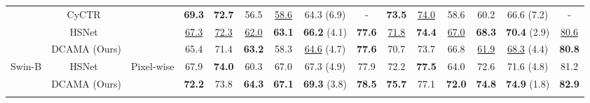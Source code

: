 \documentclass[runningheads,table,xcdraw]{llncs}
\begin{document}
\begin{table*}[t]
{\begin{tabular}{ccccccccccccccc}
\multicolumn{1}{c|}{}                            & \multicolumn{1}{c|}{CyCTR~\cite{zhang2021few}}               & \multicolumn{1}{c|}{}                            & \textbf{69.3} & \textbf{72.7} & 56.5          & \multicolumn{1}{c|}{\uline{58.6}}  & \multicolumn{1}{c|}{64.3 (6.9)}          & \multicolumn{1}{c|}{-}             & \textbf{73.5} & \uline{74.0}  & 58.6          & \multicolumn{1}{c|}{60.2}          & \multicolumn{1}{c|}{66.6 (7.2)}          & -             \\
\multicolumn{1}{c|}{}                            & \multicolumn{1}{c|}{HSNet~\cite{min2021hypercorrelation}}           & \multicolumn{1}{c|}{}                            & \uline{67.3}  & \uline{72.3}  & \uline{62.0}  & \multicolumn{1}{c|}{\textbf{63.1}} & \multicolumn{1}{c|}{\textbf{66.2} (4.1)} & \multicolumn{1}{c|}{\textbf{77.6}} & \uline{71.8}  & \textbf{74.4} & \uline{67.0}          & \multicolumn{1}{c|}{\textbf{68.3}} & \multicolumn{1}{c|}{\textbf{70.4} (2.9)} & \uline{80.6}  \\
\multicolumn{1}{c|}{}                            & \multicolumn{1}{c|}{DCAMA (Ours)}                            & \multicolumn{1}{c|}{}                            & 65.4          & 71.4          & \textbf{63.2} & \multicolumn{1}{c|}{58.3}          & \multicolumn{1}{c|}{\uline{64.6} (4.7)}  & \multicolumn{1}{c|}{\textbf{77.6}}  & 70.7          & 73.7          & 66.8 & \multicolumn{1}{c|}{\uline{61.9}}  & \multicolumn{1}{c|}{\uline{68.3} (4.4)}  & \textbf{80.8} \\ \hline
\multicolumn{1}{c|}{\multirow{2}{*}{Swin-B}}     & \multicolumn{1}{c|}{HSNet~\cite{min2021hypercorrelation}} & \multicolumn{1}{c|}{\multirow{2}{*}{Pixel-wise}} & 67.9          & \textbf{74.0} & 60.3          & \multicolumn{1}{c|}{67.0}          & \multicolumn{1}{c|}{67.3 (4.9)}          & \multicolumn{1}{c|}{77.9}          & 72.2          & \textbf{77.5} & 64.0          & \multicolumn{1}{c|}{72.6}          & \multicolumn{1}{c|}{71.6 (4.8)}          & 81.2          \\
\multicolumn{1}{c|}{}                            & \multicolumn{1}{c|}{DCAMA (Ours)}                            & \multicolumn{1}{c|}{}                            & \textbf{72.2} & 73.8          & \textbf{64.3} & \multicolumn{1}{c|}{\textbf{67.1}} & \multicolumn{1}{c|}{\textbf{69.3} (3.8)} & \multicolumn{1}{c|}{\textbf{78.5}} & \textbf{75.7} & 77.1          & \textbf{72.0} & \multicolumn{1}{c|}{\textbf{74.8}} & \multicolumn{1}{c|}{\textbf{74.9} (1.8)} & \textbf{82.9} \\ \hline
\rowcolor[HTML]{EFEFEF}

\end{tabular}}
\end{table*}
\end{document}
